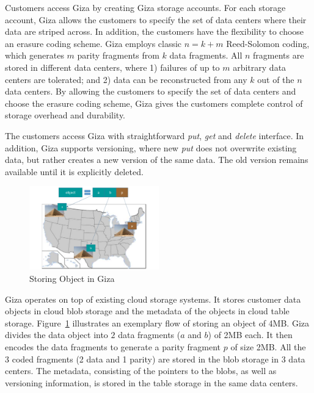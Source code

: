 Customers access Giza by creating Giza storage accounts. For each storage
account, Giza allows the customers to specify the set of data centers where
their data are striped across. In addition, the customers have the flexibility
to choose an erasure coding scheme. Giza employs classic $n = k + m$
Reed-Solomon coding, which generates $m$ parity fragments from $k$ data
fragments. All $n$ fragments are stored in different data centers, where 1)
failures of up to $m$ arbitrary data centers are tolerated; and 2) data can be
reconstructed from any $k$ out of the $n$ data centers. By allowing the
customers to specify the set of data centers and choose the erasure coding
scheme, Giza gives the customers complete control of storage overhead and durability.

The customers access Giza with straightforward {\em put}, {\em get} and {\em delete} interface. In addition, Giza supports versioning, where new {\em put} does not overwrite existing data, but rather creates a new version of the same data. The old version remains available until it is explicitly deleted.

\begin{figure}[tp]
\centering
\includegraphics[width=0.5\textwidth]{images/giza_example_crop_fit}
\caption{Storing Object in Giza}
\label{fig:giza_example}
\end{figure}

Giza operates on top of existing cloud storage systems. It stores customer data
objects in cloud blob storage and the metadata of the objects in cloud table
storage. Figure~\ref{fig:giza_example} illustrates an exemplary flow of storing
an object of 4MB.
Giza divides the data object into $2$ data fragments ($a$ and $b$) of 2MB each.
It then encodes the data fragments to generate a parity fragment $p$ of size
2MB. All the $3$ coded fragments (2 data and 1 parity) are stored in the blob
storage in 3 data centers. The metadata, consisting of the pointers to the
blobs, as well as versioning information, is stored in the table storage in the
same data centers.

